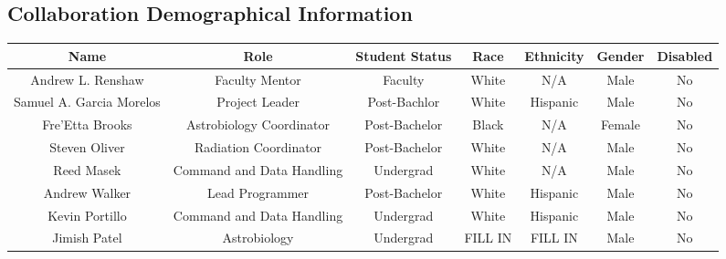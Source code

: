\begin{appendices}
  \section{Collaboration Demographical Information}
\begin{table}[h!]
\centering  
  \begin{tabular}  {ccccccc}
      \textbf{Name} &  \textbf{Role} & \textbf{Student Status} & \textbf{Race} & \textbf{Ethnicity} & \textbf{Gender} & \textbf{Disabled}\\
 	\hline
	\hline
 	Andrew L. Renshaw & Faculty Mentor & Faculty & White & N/A & Male & No\\
 	\hline
 	Samuel A. Garcia Morelos & Project Leader & Post-Bachlor & White & Hispanic & Male & No\\
 	\hline
 	Fre'Etta Brooks & Astrobiology Coordinator & Post-Bachelor & Black & N/A & Female & No\\\hline
 	Steven Oliver & Radiation Coordinator & Post-Bachelor & White & N/A & Male & No\\\hline
 	Reed Masek & Command and Data Handling & Undergrad & White & N/A & Male & No\\\hline
 	Andrew Walker & Lead Programmer & Post-Bachelor & White & Hispanic & Male & No\\\hline
 	Kevin Portillo & Command and Data Handling & Undergrad & White & Hispanic & Male & No \\\hline
	Jimish Patel & Astrobiology & Undergrad & FILL IN & FILL IN & Male & No \\
	\end{tabular}	
	\end{table}  

\end{appendices}
